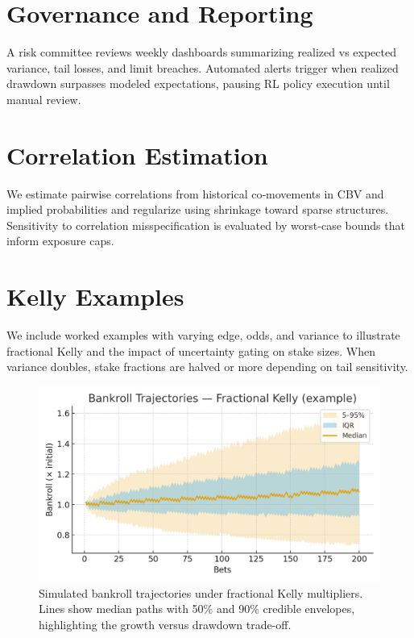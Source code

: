 \section{Governance and Reporting}
A risk committee reviews weekly dashboards summarizing realized vs expected variance, tail losses, and limit breaches. Automated alerts trigger when realized drawdown surpasses modeled expectations, pausing RL policy execution until manual review.



\section{Correlation Estimation}
We estimate pairwise correlations from historical co‑movements in CBV and implied probabilities and regularize using shrinkage toward sparse structures. Sensitivity to correlation misspecification is evaluated by worst‑case bounds that inform exposure caps.

\section{Kelly Examples}
We include worked examples with varying edge, odds, and variance to illustrate fractional Kelly and the impact of uncertainty gating on stake sizes. When variance doubles, stake fractions are halved or more depending on tail sensitivity.

\begin{figure}[t]
  \centering
  \includegraphics[width=0.9\linewidth]{../figures/bankroll_trajectories.png}
  \caption{Simulated bankroll trajectories under fractional Kelly multipliers. Lines show median paths with 50\% and 90\% credible envelopes, highlighting the growth versus drawdown trade-off.}
  \label{fig:bankroll-trajectories}
\end{figure}

